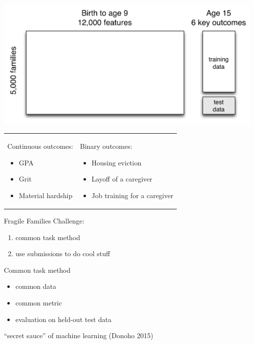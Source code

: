 \documentclass{beamer}
\begin{document}
\begin{frame}

\begin{center}
\includegraphics[width=\textwidth]{figures/challenge_design_matrix}
\end{center}

\end{frame}
\begin{frame}

\begin{tabular}{p{}p{}}
Continuous outcomes:
\begin{itemize}
\item GPA
\item Grit
\item Material hardship
\end{itemize}
&
Binary outcomes:
\begin{itemize}
\item Housing eviction
\item Layoff of a caregiver
\item Job training for a caregiver
\end{itemize}
\end{tabular}

\end{frame}
\begin{frame}

Fragile Families Challenge:
\begin{enumerate}
\item common task method
\pause
\item use submissions to do cool stuff
\end{enumerate}

\end{frame}
\begin{frame}

Common task method
\begin{itemize}
\item common data
\item common metric
\item evaluation on held-out test data
\end{itemize}

``secret sauce'' of machine learning (Donoho 2015)

\end{frame}
\end{document}
